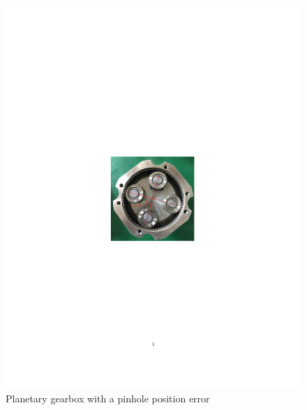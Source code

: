 \documentclass[a4paper,fleqn]{cas-sc}%
\begin{document}
\begin{figure}[pos=htbp]
    \centering
    \includegraphics[scale=0.7]{exp_pinhole_error.pdf}
    \caption{Planetary gearbox with a pinhole position error}
    \label{fig:exp_pinhole_error}
\end{figure}
\end{document}
